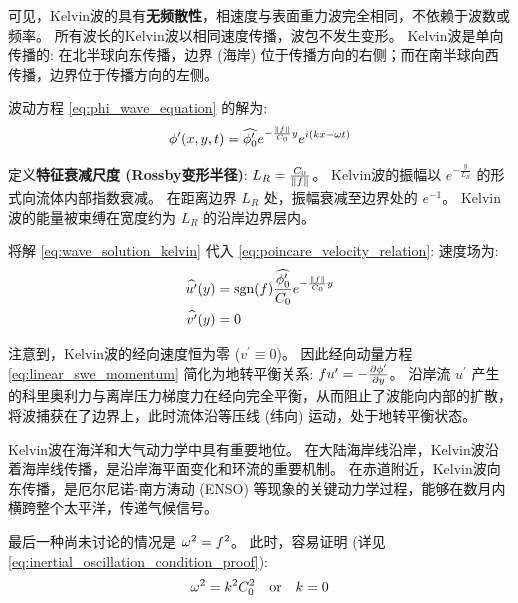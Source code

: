 可见，Kelvin波的具有\textbf{无频散性}，相速度与表面重力波完全相同，不依赖于波数或频率。
所有波长的Kelvin波以相同速度传播，波包不发生变形。
Kelvin波是单向传播的: 在北半球向东传播，边界 (海岸) 位于传播方向的右侧；而在南半球向西传播，边界位于传播方向的左侧。

波动方程 \eqref{eq:phi_wave_equation} 的解为:
\begin{equation}
    \phi^\prime(x, y, t) = \widehat{\phi_0^\prime} e^{-\frac{\lVert f \rVert}{C_0} y} e^{i (k x - \omega t)}
    \label{eq:wave_solution_kelvin}
\end{equation}

定义\textbf{特征衰减尺度 (Rossby变形半径)}: $L_R = \frac{C_0}{\lVert f \rVert}$。
Kelvin波的振幅以 $e^{-\frac{y}{L_R}}$ 的形式向流体内部指数衰减。
在距离边界 $L_R$ 处，振幅衰减至边界处的 $e^{-1}$。
Kelvin波的能量被束缚在宽度约为 $L_R$ 的沿岸边界层内。

将解 \eqref{eq:wave_solution_kelvin} 代入 \eqref{eq:poincare_velocity_relation}:
速度场为:
\begin{align}
    \widehat{u^\prime}(y) &= \text{sgn}(f) \frac{\widehat{\phi_0^\prime}}{C_0} e^{-\frac{\lVert f \rVert}{C_0} y} \label{eq:u_solution_kelvin} \\
    \widehat{v^\prime}(y) &= 0 \label{eq:v_solution_kelvin}
\end{align}

注意到，Kelvin波的经向速度恒为零 ($v^\prime \equiv 0$)。
因此经向动量方程 \eqref{eq:linear_swe_momentum} 简化为地转平衡关系: $\coriolis u^\prime = -\pde{\gravpotential^\prime}{y}$。
沿岸流 $u^\prime$ 产生的科里奥利力与离岸压力梯度力在经向完全平衡，从而阻止了波能向内部的扩散，将波捕获在了边界上，此时流体沿等压线 (纬向) 运动，处于地转平衡状态。

Kelvin波在海洋和大气动力学中具有重要地位。
在大陆海岸线沿岸，Kelvin波沿着海岸线传播，是沿岸海平面变化和环流的重要机制。
在赤道附近，Kelvin波向东传播，是厄尔尼诺-南方涛动 (ENSO) 等现象的关键动力学过程，能够在数月内横跨整个太平洋，传递气候信号。

\vspace{1em}

最后一种尚未讨论的情况是 $\omega^2 = f^2$。
此时，容易证明 (详见 \eqref{eq:inertial_oscillation_condition_proof}):
\begin{equation}
    \omega^2 = k^2 C_0^2 \quad \text{or} \quad k = 0
    \label{eq:inertial_oscillation_condition}
\end{equation}

